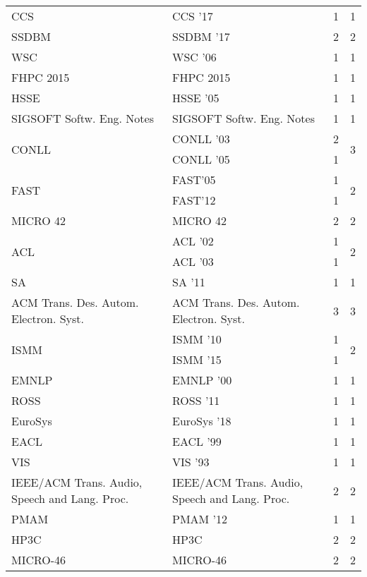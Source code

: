\begin{table*}[t]
\begin{tabular}{llrr}
\multirow{1}{*}{CCS } & CCS '17 & 1 & \multirow{1}{*}{1}\\
\multirow{1}{*}{SSDBM } & SSDBM '17 & 2 & \multirow{1}{*}{2}\\
\multirow{1}{*}{WSC } & WSC '06 & 1 & \multirow{1}{*}{1}\\
\multirow{1}{*}{FHPC 2015} & FHPC 2015 & 1 & \multirow{1}{*}{1}\\
\multirow{1}{*}{HSSE } & HSSE '05 & 1 & \multirow{1}{*}{1}\\
\multirow{1}{*}{SIGSOFT Softw. Eng. Notes} & SIGSOFT Softw. Eng. Notes & 1 & \multirow{1}{*}{1}\\
\multirow{2}{*}{CONLL } & CONLL '03 & 2 & \multirow{2}{*}{3}\\
& CONLL '05 & 1 &\\
\multirow{2}{*}{FAST} & FAST'05 & 1 & \multirow{2}{*}{2}\\
& FAST'12 & 1 &\\
\multirow{1}{*}{MICRO 42} & MICRO 42 & 2 & \multirow{1}{*}{2}\\
\multirow{2}{*}{ACL } & ACL '02 & 1 & \multirow{2}{*}{2}\\
& ACL '03 & 1 &\\
\multirow{1}{*}{SA } & SA '11 & 1 & \multirow{1}{*}{1}\\
\multirow{1}{*}{ACM Trans. Des. Autom. Electron. Syst.} & ACM Trans. Des. Autom. Electron. Syst. & 3 & \multirow{1}{*}{3}\\
\multirow{2}{*}{ISMM } & ISMM '10 & 1 & \multirow{2}{*}{2}\\
& ISMM '15 & 1 &\\
\multirow{1}{*}{EMNLP } & EMNLP '00 & 1 & \multirow{1}{*}{1}\\
\multirow{1}{*}{ROSS } & ROSS '11 & 1 & \multirow{1}{*}{1}\\
\multirow{1}{*}{EuroSys } & EuroSys '18 & 1 & \multirow{1}{*}{1}\\
\multirow{1}{*}{EACL } & EACL '99 & 1 & \multirow{1}{*}{1}\\
\multirow{1}{*}{VIS } & VIS '93 & 1 & \multirow{1}{*}{1}\\
\multirow{1}{*}{IEEE/ACM Trans. Audio, Speech and Lang. Proc.} & IEEE/ACM Trans. Audio, Speech and Lang. Proc. & 2 & \multirow{1}{*}{2}\\
\multirow{1}{*}{PMAM } & PMAM '12 & 1 & \multirow{1}{*}{1}\\
\multirow{1}{*}{HP3C} & HP3C & 2 & \multirow{1}{*}{2}\\
\multirow{1}{*}{MICRO-46} & MICRO-46 & 2 & \multirow{1}{*}{2}\\

\end{tabular}
\end{table*}
